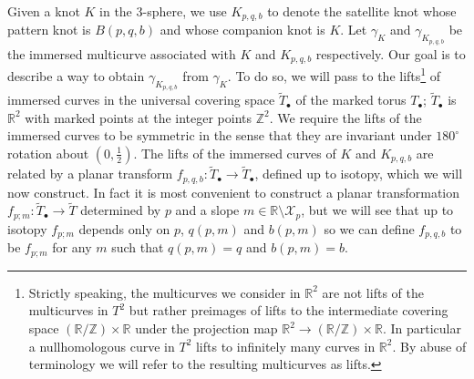 \documentclass{amsart}
\newcommand{\Z}{\mathbb{Z}}
\newcommand{\R}{\mathbb{R}}
\theoremstyle{definition}
\theoremstyle{remark}
\numberwithin{equation}{section}
\numberwithin{equation}{section} \makeatletter
\begin{document}
Given a knot $K$ in the 3-sphere, we use $K_{p,q,b}$ to denote the satellite knot whose pattern knot is $B(p,q,b)$ and whose companion knot is $K$. Let $\gamma_K$ and $\gamma_{K_{p,q,b}}$ be the immersed multicurve associated with $K$ and $K_{p,q,b}$ respectively. Our goal is to describe a way to obtain $\gamma_{K_{p,q,b}}$ from $\gamma_K$. To do so, we will pass to the lifts\footnote{Strictly speaking, the multicurves we consider in $\R^2$ are not lifts of the multicurves in $T^2$ but rather preimages of lifts to the intermediate covering space $(\R/\Z)\times \R$ under the projection map $\R^2 \to (\R/\Z)\times \R$. In particular a nullhomologous curve in $T^2$ lifts to infinitely many curves in $\R^2$. By abuse of terminology we will refer to the resulting multicurves as lifts.} of immersed curves in the universal covering space $\widetilde{T}_{\bullet}$ of the marked torus ${T}_{\bullet}$;  $\widetilde{T}_{\bullet}$ is $\R^2$ with marked points at the integer points $\mathbb{Z}^2$. We require the lifts of the immersed curves to be symmetric in the sense that they are invariant under $180^\circ$ rotation about $(0,\frac{1}{2})$. The lifts of the immersed curves of $K$ and ${K_{p,q,b}}$ are related by a planar transform $f_{p,q,b}:\widetilde{T}_{\bullet} \rightarrow \widetilde{T}_{\bullet}$, defined up to isotopy, which we will now construct. In fact it is most convenient to construct a planar transformation $f_{p; m}: \widetilde{T}_{\bullet} \rightarrow \widetilde{T}$ determined by $p$ and a slope $m \in \R \setminus \mathcal{X}_p$, but we will see that up to isotopy $f_{p; m}$ depends only on $p$, $q(p,m)$ and $b(p,m)$ so we can define $f_{p,q,b}$ to be $f_{p;m}$ for any $m$ such that $q(p,m) = q$ and $b(p,m) = b$.
 
\end{document}
